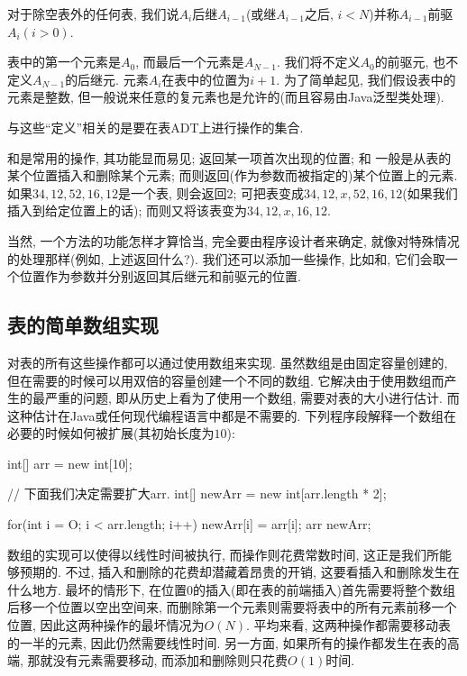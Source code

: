 \documentclass[oneside]{ctexbook}
\begin{document}
对于除空表外的任何表, 我们说$A_i$后继$A_{i-1}$(或继$A_{i-1}$之后, $i<N$)并称$A_{i-1}$前驱$A_i(i>0)$.

表中的第一个元素是$A_0$, 而最后一个元素是$A_{N-1}$. 我们将不定义$A_0$的前驱元, 也不定义$A_{N-1}$的后继元. 元素$A_i$在表中的位置为$i+1$. 为了简单起见, 我们假设表中的元素是整数, 但一般说来任意的复元素也是允许的(而且容易由Java泛型类处理).

与这些``定义''相关的是要在表ADT上进行操作的集合.

和是常用的操作, 其功能显而易见; 返回某一项首次出现的位置; 和 一般是从表的某个位置插入和删除某个元素; 而则返回(作为参数而被指定的)某个位置上的元素. 如果$34,12,52,16,12$是一个表, 则会返回$2$; 可把表变成$34,12,x,52,16,12$(如果我们插入到给定位置上的话); 而则又将该表变为$34,12,x,16,12$.

当然, 一个方法的功能怎样才算恰当, 完全要由程序设计者来确定, 就像对特殊情况的处理那样(例如, 上述返回什么?). 我们还可以添加一些操作, 比如和, 它们会取一个位置作为参数并分别返回其后继元和前驱元的位置.

\subsection{表的简单数组实现}

对表的所有这些操作都可以通过使用数组来实现. 虽然数组是由固定容量创建的, 但在需要的时候可以用双倍的容量创建一个不同的数组. 它解决由于使用数组而产生的最严重的问题, 即从历史上看为了使用一个数组, 需要对表的大小进行估计. 而这种估计在Java或任何现代编程语言中都是不需要的. 下列程序段解释一个数组在必要的时候如何被扩展(其初始长度为$10$):

\begin{myjava}{}{}
int[] arr = new int[10];

// 下面我们决定需要扩大arr.
int[] newArr = new int[arr.length * 2];

for(int i = O; i < arr.length; i++)
    newArr[i] = arr[i];
arr newArr;
\end{myjava}

数组的实现可以使得以线性时间被执行, 而操作则花费常数时间, 这正是我们所能够预期的. 不过, 插入和删除的花费却潜藏着昂贵的开销, 这要看插入和删除发生在什么地方. 最坏的情形下, 在位置$0$的插入(即在表的前端插入)首先需要将整个数组后移一个位置以空出空间来, 而删除第一个元素则需要将表中的所有元素前移一个位置, 因此这两种操作的最坏情况为$O(N)$. 平均来看, 这两种操作都需要移动表的一半的元素, 因此仍然需要线性时间. 另一方面, 如果所有的操作都发生在表的高端, 那就没有元素需要移动, 而添加和删除则只花费$O(1)$时间.
\end{document}
